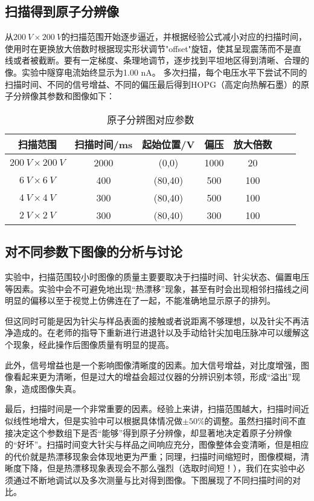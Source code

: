 \documentclass[aps,pre,12pt,preprint,onecolumn,showpacs,showkeys]{revtex4-1}
\begin{document}
\subsection{扫描得到原子分辨像}
从$200\ V\times200\ V$的扫描范围开始逐步逼近，并根据经验公式减小对应的扫描时间，使用时在更换放大倍数时根据现实形状调节"offset"旋钮，使其呈现震荡而不是直线或者被截断。要有一定梯度、条理地调节，逐步找到平坦地区得到清晰、合理的像。实验中隧穿电流始终显示为1.00 nA。
多次扫描，每个电压水平下尝试不同的扫描时间、不同的信号增益、不同的偏压最后得到HOPG（高定向热解石墨）的原子分辨像其参数和图像如下：
\begin{table}[!h]
	\caption{原子分辨图对应参数}
	\begin{ruledtabular}
		\begin{tabular}{ccccccc}
			
			扫描范围 &  扫描时间/ms  & 起始位置/V & 偏压  & 放大倍数\\
			\hline
            $200\ V \times200\ V$ & 2000 & (0,0) & 1000& 20\\
            $6\ V \times6\ V$ & 400 & (80,40) & 500& 100\\
            $4\ V \times4\ V$ & 300 & (80,40) & 500& 100\\
            $2\ V \times2\ V$ & 300 & (80,40) & 300& 100\\

			
		\end{tabular}
	\end{ruledtabular}
	\label{tab:表4}
\end{table}




\subsection{对不同参数下图像的分析与讨论}
实验中，扫描范围较小时图像的质量主要要取决于扫描时间、针尖状态、偏置电压等因素。实验中会不可避免地出现“热漂移”现象，甚至有时会出现相邻扫描线之间明显的偏移以至于视觉上仿佛连在了一起，不能准确地显示原子的排列。\par
但这同时可能是因为针尖与样品表面的接触或者说距离不够理想，以及针尖不再洁净造成的。在老师的指导下重新进行进退针以及手动给针尖加电压脉冲可以缓解这个现象，经此操作后图像质量有明显的提高。\par
此外，信号增益也是一个影响图像清晰度的因素。加大信号增益，对比度增强，图像看起来更为清晰，但是过大的增益会超过仪器的分辨识别本领，形成“溢出”现象，造成图像失真。\par
最后，扫描时间是一个非常重要的因素。经验上来讲，扫描范围越大，扫描时间近似线性地增大，但是实验中可以根据具体情况做$\pm 50\%$的调整。虽然扫描时间不直接决定这个参数组下是否“能够”得到原子分辨像，却显著地决定着原子分辨像的“好坏”。扫描时间变大针尖与样品之间响应充分，图像整体会变清晰，但是相应的代价就是热漂移现象会体现地更为严重；同理，扫描时间缩短时，图像模糊，清晰度下降，但是热漂移现象表现会不那么强烈（选取时间短！），我们在实验中必须通过不断地调试以及多次测量与比对得到图像。下图展现了不同扫描时间的对比。\par
\end{document}
